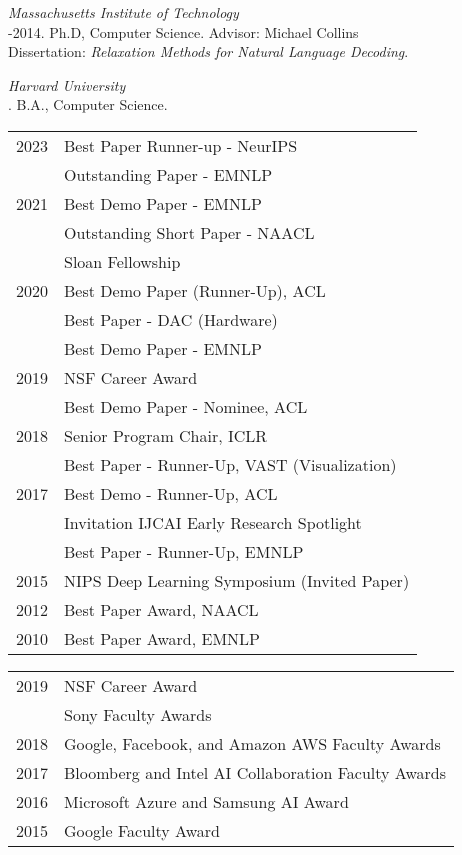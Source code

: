 \documentclass[10pt]{article}
\begin{document}
\noindent\emph{Massachusetts Institute of Technology \vspace{0.01in}}\\
-2014.  Ph.D, Computer Science. Advisor: Michael Collins\\
\ind Dissertation: \emph{Relaxation Methods for Natural Language Decoding}. %



\medskip
\noindent\emph{Harvard University\vspace{0.02in}}\\
. B.A., Computer Science.

\bigskip


\hspace{-1cm} \begin{tabular}{lp{11.5cm}}
2023 & Best Paper Runner-up -  NeurIPS \\
     & Outstanding Paper -  EMNLP \\
2021 & Best Demo Paper -  EMNLP \\
     & Outstanding Short Paper -  NAACL \\
     & Sloan Fellowship\\
2020 & Best Demo Paper (Runner-Up), ACL   \\
& Best Paper - DAC (Hardware)  \\
& Best Demo Paper - EMNLP  \\
2019 & NSF Career Award \\
& Best Demo Paper - Nominee, ACL   \\
2018 & Senior Program Chair, ICLR  \\
& Best Paper - Runner-Up, VAST (Visualization)  \\
2017 & Best Demo  - Runner-Up, ACL  \\
 & Invitation IJCAI Early Research Spotlight \\
& Best Paper - Runner-Up, EMNLP \\
2015 & NIPS Deep Learning Symposium (Invited Paper)   \\
2012 & Best Paper Award, NAACL \\
2010 & Best Paper Award, EMNLP \\
\end{tabular}



\hspace{-1cm} \begin{tabular}{lp{11.5cm}}
2019 & NSF Career Award \\
& Sony Faculty Awards \\
2018& Google, Facebook, and Amazon AWS Faculty Awards \\
2017 & Bloomberg and Intel AI Collaboration Faculty Awards \\
2016 & Microsoft Azure  and Samsung AI Award \\
2015 & Google Faculty Award \\
\end{tabular}
\pagebreak
\end{document}
